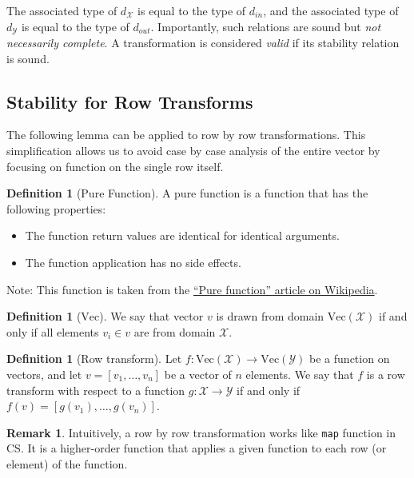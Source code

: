 \documentclass[11pt,a4paper]{article}
\theoremstyle{definition}
\newtheorem{remark}[theorem]{Remark}
\newtheorem{definition}[theorem]{Definition}
\newcommand{\Vect}{\mathrm{Vec}}
\newcommand{\din}{d_{in}}
\newcommand{\dout}{d_{out}}
\newcommand{\X}{\mathcal{X}}
\newcommand{\Y}{\mathcal{Y}}
\newcommand{\silvia}[1]{{ {\color{blue}{(silvia)~#1}}}}
\newcommand{\grace}[1]{{ {\color{purple}{(grace)~#1}}}}
\begin{document}
The associated type of $d_{\X}$ is equal to the type of $\din$, and the associated type of $d_{\Y}$ is equal to the type of $\dout$. Importantly, such relations are sound but \textit{not necessarily complete}. A transformation is considered \textit{valid} if its stability relation is sound.

\subsection{Stability for Row Transforms}
The following lemma can be applied to row by row transformations. This simplification allows us to avoid case by case analysis of the entire vector by focusing on function on the single row itself. 

\begin{definition}[Pure Function]
    A pure function is a function that has the following properties:
    \begin{itemize}
        \item The function return values are identical for identical arguments.
        \item The function application has no side effects.
    \end{itemize}
\end{definition}

Note: This function is taken from the \href{https://en.wikipedia.org/wiki/Pure_function}{``Pure function'' article on Wikipedia}. \grace{The definition will need to be modified according to Marco's comments.} 

\silvia{Also need to add the definition of randomized pure function?}

\begin{definition}[$\Vect$]
    We say that vector $v$ is drawn from domain $\Vect(\mathcal{X})$ if and only if all elements $v_i\in v$ are from domain $\mathcal{X}$.
\end{definition}

\begin{definition}[Row transform]
Let $f: \Vect(\mathcal{X})\rightarrow \Vect(\mathcal{Y})$ be a function on vectors, and let $v = [v_1,\ldots,v_n]$ be a vector of $n$ elements. We say that $f$ is a row transform with respect to a function $g:\mathcal{X}\rightarrow\mathcal{Y}$ if and only if $f(v) = [g(v_1), \ldots, g(v_n)]$.
\end{definition}

\begin{remark}
    Intuitively, a row by row transformation works like \texttt{map} function in CS. It is a higher-order function that applies a given function to each row (or element) of the function. 
\end{remark}
\end{document}

